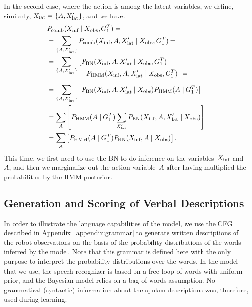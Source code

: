 In the second case, where the action is among the latent variables, we define, similarly, $X_\text{lat} = \{A, X_\text{lat}^\prime\}$, and we have:
\begin{align} \label{eq:fusion_including_action}
  & \pcomb(\xinf \given \xobs, G_1^T) = \nonumber \\
  &= \sum_{\{A,\xlat^\prime\}} \pcomb(\xinf, A, \xlat^\prime \given \xobs, G_1^T)= \nonumber \\
  &= \sum_{\{A,\xlat^\prime\}} \left[\pbn(\xinf, A, \xlat^\prime \given \xobs, G_1^T)\right. \nonumber \\[-4mm]
    & \mspace{100mu} \left.\phmm(\xinf, A, \xlat^\prime \given \xobs, G_1^T)\right]= \nonumber \\[2mm]
  &= \sum_{\{A,\xlat^\prime\}} \left[\pbn(\xinf, A, \xlat^\prime \given \xobs) \phmm(A \given G_1^T)\right] \nonumber \\
  &= \sum_{A}\left[\phmm(A \given G_1^T)\sum_{\xlat^\prime} \pbn(\xinf, A, \xlat^\prime \given \xobs)\right] \nonumber \\
  &= \sum_{A}\left[\phmm(A \given G_1^T) \pbn(\xinf, A \given \xobs)\right].
\end{align}
This time, we first need to use the \ac{BN} to do inference on the variables~$X_\text{inf}$ and~$A$, and then we marginalize out the action variable~$A$ after having multiplied the probabilities by the \ac{HMM} posterior.

\subsection{Generation and Scoring of Verbal Descriptions}
\label{sec:method:verbal}

In order to illustrate the language capabilities of the model, we use the \ac{CFG} described in Appendix~\ref{appendix:grammar} to generate written descriptions of the robot observations on the basis of the probability distributions of the words inferred by the model.
Note that this grammar is defined here with the only purpose to interpret the probability distributions over the words.
In the \AffWords{} model that we use, the speech recognizer is based on a free loop of words with uniform prior, and the Bayesian model relies on a bag-of-words assumption.
No grammatical (syntactic) information about the spoken descriptions was, therefore, used during learning.

